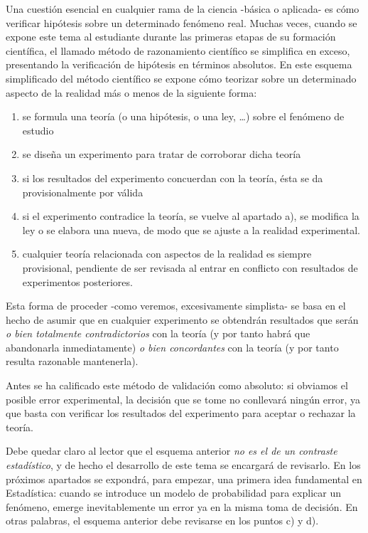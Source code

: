 \documentclass[
]{article}
\providecommand{\tightlist}{%
  \setlength{\itemsep}{0pt}\setlength{\parskip}{0pt}}
\begin{document}
Una cuestión esencial en cualquier rama de la ciencia -básica o aplicada- es cómo verificar hipótesis sobre un determinado fenómeno real. Muchas veces, cuando se expone este tema al estudiante durante las primeras etapas de su formación científica, el llamado método de razonamiento científico se simplifica en exceso, presentando la verificación de hipótesis en términos absolutos. En este esquema simplificado del método científico se expone cómo teorizar sobre un determinado aspecto de la realidad más o menos de la siguiente forma:

\begin{enumerate}
\def\labelenumi{\alph{enumi})}
\tightlist
\item
  se formula una teoría (o una hipótesis, o una ley, \ldots) sobre el fenómeno de estudio\\
\item
  se diseña un experimento para tratar de corroborar dicha teoría\\
\item
  si los resultados del experimento concuerdan con la teoría, ésta se da provisionalmente por válida\\
\item
  si el experimento contradice la teoría, se vuelve al apartado a), se modifica la ley o se elabora una nueva, de modo que se ajuste a la realidad experimental.\\
\item
  cualquier teoría relacionada con aspectos de la realidad es siempre provisional, pendiente de ser revisada al entrar en conflicto con resultados de experimentos posteriores.
\end{enumerate}

Esta forma de proceder -como veremos, excesivamente simplista- se basa en el hecho de asumir que en cualquier experimento se obtendrán resultados que serán \emph{o bien totalmente contradictorios} con la teoría (y por tanto habrá que abandonarla inmediatamente) \emph{o bien concordantes} con la teoría (y por tanto resulta razonable mantenerla).

Antes se ha calificado este método de validación como absoluto: si obviamos el posible error experimental, la decisión que se tome no conllevará ningún error, ya que basta con verificar los resultados del experimento para aceptar o rechazar la teoría.

Debe quedar claro al lector que el esquema anterior \emph{no es el de un contraste estadístico}, y de hecho el desarrollo de este tema se encargará de revisarlo. En los próximos apartados se expondrá, para empezar, una primera idea fundamental en Estadística: cuando se introduce un modelo de probabilidad para explicar un fenómeno, emerge inevitablemente un error ya en la misma toma de decisión. En otras palabras, el esquema anterior debe revisarse en los puntos c) y d).
\end{document}
